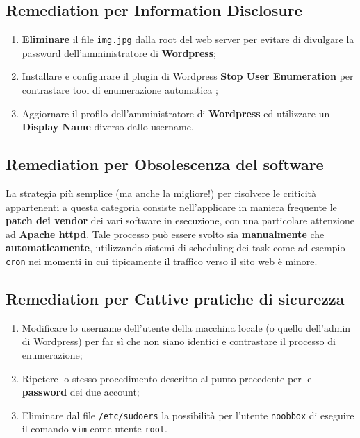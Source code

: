 \documentclass[a4paper, 12pt, oneside]{article}
\begin{document}
\subsection{Remediation per \textbf{Information Disclosure}}
\begin{enumerate}
    \item \textbf{Eliminare} il file \texttt{img.jpg} dalla root del web server per evitare di divulgare la password dell'amministratore di \textbf{Wordpress};
    \item Installare e configurare il plugin di Wordpress \textbf{Stop User Enumeration} per contrastare tool di enumerazione automatica \cite{sue};
    \item Aggiornare il profilo dell'amministratore di \textbf{Wordpress} ed utilizzare un \textbf{Display Name} diverso dallo username.
\end{enumerate}

\subsection{Remediation per \textbf{Obsolescenza del software}}
La strategia più semplice (ma anche la migliore!) per risolvere le criticità appartenenti a questa categoria consiste nell'applicare in maniera frequente le \textbf{patch dei vendor} dei vari software in esecuzione, con una particolare attenzione ad \textbf{Apache httpd}. Tale processo può essere svolto sia \textbf{manualmente} che \textbf{automaticamente}, utilizzando sistemi di scheduling dei task come ad esempio \texttt{cron} nei momenti in cui tipicamente il traffico verso il sito web è minore.

\newpage
\subsection{Remediation per \textbf{Cattive pratiche di sicurezza}}
\begin{enumerate}
    \item Modificare lo username dell'utente della macchina locale (o quello dell'admin di Wordpress) per far sì che non siano identici e contrastare il processo di enumerazione;
    \item Ripetere lo stesso procedimento descritto al punto precedente per le \textbf{password} dei due account;
    \item Eliminare dal file \texttt{/etc/sudoers} la possibilità per l'utente \texttt{noobbox} di eseguire il comando \texttt{vim} come utente \texttt{root}.
\end{enumerate}
\newpage
\end{document}
